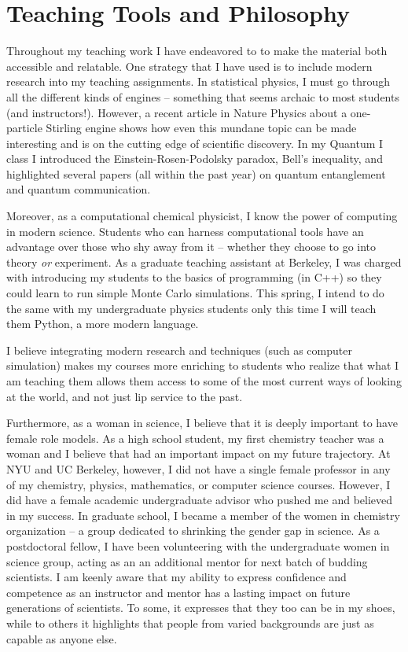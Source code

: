 \documentclass[11pt]{article}
\begin{document}
\section{Teaching Tools and Philosophy}

Throughout my teaching work I have endeavored to to make the material both accessible and relatable.  One strategy that I have used is to include modern research into my teaching assignments.  In statistical physics, I must go through all the different kinds of engines -- something that seems archaic to most students (and instructors!).  However, a recent article in Nature Physics about a one-particle Stirling engine shows how even this mundane topic can be made interesting and is on the cutting edge of scientific discovery.  In my Quantum I class I introduced the Einstein-Rosen-Podolsky paradox, Bell's inequality, and highlighted several papers (all within the past year) on quantum entanglement and quantum communication.

Moreover, as a computational chemical physicist, I know the power of computing in modern science.  Students who can harness computational tools have an advantage over those who shy away from it  -- whether they choose to go into theory \textit{or} experiment.  As a graduate teaching assistant at Berkeley, I was charged with introducing my students to the basics of programming (in C++) so they could learn to run simple Monte Carlo simulations.  This spring, I intend to do the same with my undergraduate physics students only this time I will teach them Python, a more modern language.

I believe integrating modern research and techniques (such as computer simulation) makes my courses more enriching to students who realize that what I am teaching them allows them access to some of the most current ways of looking at the world, and not just lip service to the past.

Furthermore, as a woman in science, I believe that it is deeply important to have female role models.  As a high school student, my first chemistry teacher was a woman and I believe that had an important impact on my future trajectory.  At NYU and UC Berkeley, however, I did not have a single female professor in any of my chemistry, physics, mathematics, or computer science courses.  However, I did have a female academic undergraduate advisor who pushed me and believed in my success.  In graduate school, I became a member of the women in chemistry organization -- a group dedicated to shrinking the gender gap in science.  As a postdoctoral fellow, I have been volunteering with the undergraduate women in science group, acting as an an additional mentor for next batch of budding scientists.  I am keenly aware that my ability to express confidence and competence as an instructor and mentor has a lasting impact on future generations of scientists.  To some, it expresses that they too can be in my shoes, while to others it highlights that people from varied backgrounds are just as capable as anyone else.
\end{document}
